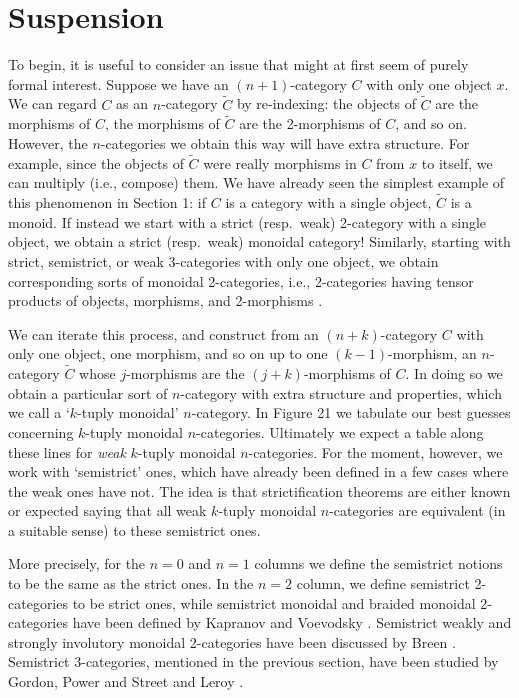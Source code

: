 \section{Suspension}

To begin, it is useful to consider an issue that might at first
seem of purely formal interest.  Suppose we have an
$(n+1)$-category $C$ with only one object $x$.    We can
regard $C$ as an $n$-category $\tilde C$ by re-indexing: the
objects of $\tilde C$ are the morphisms of $C$, the morphisms of
$\tilde C$ are the 2-morphisms of $C$, and so on.  However, the
$n$-categories we obtain this way will have extra structure.  For
example, since the objects of $\tilde C$ were really morphisms in
$C$ from $x$ to itself, we can multiply (i.e., compose) them.
We have already seen the simplest example of this phenomenon in
Section 1: if $C$ is a category with a single object, $\tilde C$
is a monoid.   If instead we start with a strict (resp.\ weak)
2-category with a single object, we obtain a strict (resp.\ weak)
monoidal category!   Similarly, starting with strict, semistrict,
or weak 3-categories with only one object, we obtain
corresponding sorts of monoidal 2-categories, i.e., 2-categories
having tensor products of objects, morphisms, and 2-morphisms
\cite{GPS,KV}.

We can iterate this process, and construct from an
$(n+k)$-category $C$ with only one object, one  morphism, and so
on up to one $(k-1)$-morphism, an $n$-category $\tilde C$ whose
$j$-morphisms are the $(j+k)$-morphisms of $C$.  In doing so we
obtain a particular sort of $n$-category with extra structure and
properties, which we call a `$k$-tuply monoidal' $n$-category.  In
Figure 21 we tabulate our best guesses concerning  $k$-tuply
monoidal $n$-categories.  Ultimately we expect a table along
these lines for {\it weak} $k$-tuply monoidal $n$-categories.
For the moment, however, we work with `semistrict' ones,
which have already been defined in a few cases where the weak ones have not.
The idea is that strictification theorems are either known or
expected saying that all weak $k$-tuply monoidal
$n$-categories are equivalent (in a suitable sense) to these
semistrict ones.

More precisely, for the $n = 0$ and $n = 1$ columns we define the
semistrict notions to be the same as the strict ones.  In the $n
= 2$ column, we define semistrict 2-categories to be strict ones,
while semistrict monoidal and braided monoidal 2-categories have
been defined by Kapranov and Voevodsky \cite{KV}.  Semistrict
weakly and strongly involutory monoidal 2-categories have been
discussed by Breen \cite{Breen}.  Semistrict 3-categories,
mentioned in the previous section, have been studied by Gordon,
Power and Street \cite{GPS} and Leroy \cite{Leroy}.


